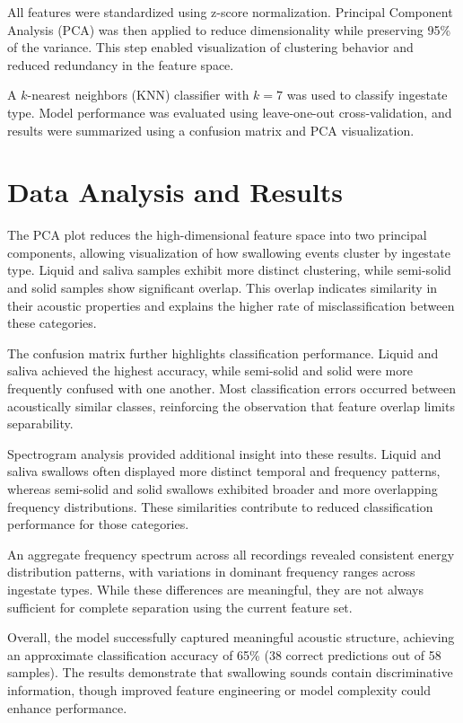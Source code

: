 \documentclass[conference]{IEEEtran}
\begin{document}
All features were standardized using z-score normalization. Principal Component Analysis (PCA) was then applied to reduce dimensionality while preserving 95\% of the variance. This step enabled visualization of clustering behavior and reduced redundancy in the feature space.

A $k$-nearest neighbors (KNN) classifier with $k=7$ was used to classify ingestate type. Model performance was evaluated using leave-one-out cross-validation, and results were summarized using a confusion matrix and PCA visualization.

\section{Data Analysis and Results}

The PCA plot reduces the high-dimensional feature space into two principal components, allowing visualization of how swallowing events cluster by ingestate type. Liquid and saliva samples exhibit more distinct clustering, while semi-solid and solid samples show significant overlap. This overlap indicates similarity in their acoustic properties and explains the higher rate of misclassification between these categories.

The confusion matrix further highlights classification performance. Liquid and saliva achieved the highest accuracy, while semi-solid and solid were more frequently confused with one another. Most classification errors occurred between acoustically similar classes, reinforcing the observation that feature overlap limits separability.

Spectrogram analysis provided additional insight into these results. Liquid and saliva swallows often displayed more distinct temporal and frequency patterns, whereas semi-solid and solid swallows exhibited broader and more overlapping frequency distributions. These similarities contribute to reduced classification performance for those categories.

An aggregate frequency spectrum across all recordings revealed consistent energy distribution patterns, with variations in dominant frequency ranges across ingestate types. While these differences are meaningful, they are not always sufficient for complete separation using the current feature set.

Overall, the model successfully captured meaningful acoustic structure, achieving an approximate classification accuracy of 65\% (38 correct predictions out of 58 samples). The results demonstrate that swallowing sounds contain discriminative information, though improved feature engineering or model complexity could enhance performance.
\end{document}
